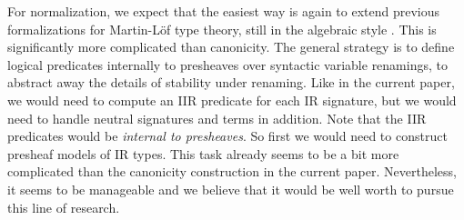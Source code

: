 \documentclass[acmsmall,screen,review]{acmart}
\begin{document}
For normalization, we expect that the easiest way is again to extend previous formalizations for
Martin-Löf type theory, still in the algebraic style
\cite{DBLP:journals/lmcs/AltenkirchK17,coquand2018canonicity,sterlingthesis,DBLP:conf/fscd/BocquetKS23}. This
is significantly more complicated than canonicity. The general strategy is to define logical
predicates internally to presheaves over syntactic variable renamings, to abstract away the details
of stability under renaming. Like in the current paper, we would need to compute an IIR predicate
for each IR signature, but we would need to handle neutral signatures and terms in addition. Note
that the IIR predicates would be \emph{internal to presheaves}. So first we would need to
construct presheaf models of IR types. This task already seems to be a bit more complicated than the
canonicity construction in the current paper. Nevertheless, it seems to be manageable and we believe
that it would be well worth to pursue this line of research.



\end{document}
